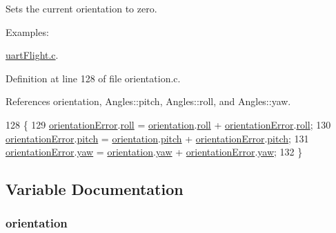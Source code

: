 Sets the current orientation to zero. 

\begin{Desc}
\item[Examples\-: ]\par
\hyperlink{uart_flight_8c-example}{uart\-Flight.\-c}.\end{Desc}


Definition at line 128 of file orientation.\-c.



References orientation, Angles\-::pitch, Angles\-::roll, and Angles\-::yaw.


\begin{DoxyCode}
128                            \{
129     \hyperlink{group__orientation_gab42c272957b0a5cdc11845ade183c2f9}{orientationError}.\hyperlink{struct_angles_a1d3228afa3a1d6773954f40c1e519eb9}{roll} = \hyperlink{group__orientation_gacd4a2942520b68691db5aebde4e537a4}{orientation}.\hyperlink{struct_angles_a1d3228afa3a1d6773954f40c1e519eb9}{roll} + 
      \hyperlink{group__orientation_gab42c272957b0a5cdc11845ade183c2f9}{orientationError}.\hyperlink{struct_angles_a1d3228afa3a1d6773954f40c1e519eb9}{roll};
130     \hyperlink{group__orientation_gab42c272957b0a5cdc11845ade183c2f9}{orientationError}.\hyperlink{struct_angles_a34c057a0378030db67bd6a129f37d938}{pitch} = \hyperlink{group__orientation_gacd4a2942520b68691db5aebde4e537a4}{orientation}.\hyperlink{struct_angles_a34c057a0378030db67bd6a129f37d938}{pitch} + 
      \hyperlink{group__orientation_gab42c272957b0a5cdc11845ade183c2f9}{orientationError}.\hyperlink{struct_angles_a34c057a0378030db67bd6a129f37d938}{pitch};
131     \hyperlink{group__orientation_gab42c272957b0a5cdc11845ade183c2f9}{orientationError}.\hyperlink{struct_angles_a21cd490f6191f66678f55b4c242a10cf}{yaw} = \hyperlink{group__orientation_gacd4a2942520b68691db5aebde4e537a4}{orientation}.\hyperlink{struct_angles_a21cd490f6191f66678f55b4c242a10cf}{yaw} + 
      \hyperlink{group__orientation_gab42c272957b0a5cdc11845ade183c2f9}{orientationError}.\hyperlink{struct_angles_a21cd490f6191f66678f55b4c242a10cf}{yaw};
132 \}
\end{DoxyCode}


\subsection{Variable Documentation}
\hypertarget{group__orientation_gacd4a2942520b68691db5aebde4e537a4}{
\subsubsection[{orientation}]{ orientation}}\label{group__orientation_gacd4a2942520b68691db5aebde4e537a4}


